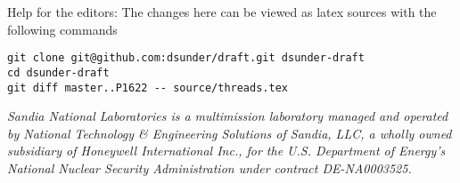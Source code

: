 Help for the editors: The changes here can be viewed as latex sources with the following commands
\begin{verbatim}
git clone git@github.com:dsunder/draft.git dsunder-draft
cd dsunder-draft
git diff master..P1622 -- source/threads.tex
\end{verbatim}


\textit{Sandia National Laboratories is a multimission laboratory managed and operated
by National Technology \& Engineering Solutions of Sandia, LLC, a wholly owned
subsidiary of Honeywell International Inc., for the U.S. Department of Energy’s
National Nuclear Security Administration under contract DE-NA0003525.
}
\newpage
